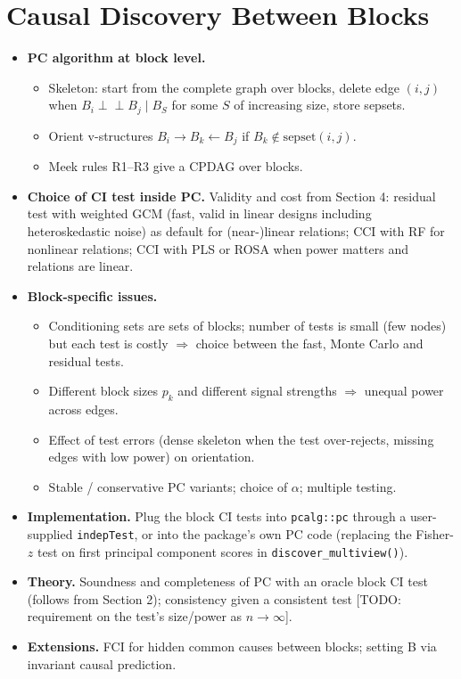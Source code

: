 \documentclass[10pt,leqno]{amsart}
\newcommand{\todo}[1]{{\color{red}[TODO: #1]}}
\newcommand{\ci}{\perp\!\!\!\perp}          %
\newcommand{\fn}[1]{\texttt{#1}}            %
\begin{document}
\section{Causal Discovery Between Blocks}
\begin{itemize}
\item \textbf{PC algorithm at block level.}
  \begin{itemize}
  \item Skeleton: start from the complete graph over blocks, delete edge $(i,j)$ when
    $B_i\ci B_j\mid B_S$ for some $S$ of increasing size, store sepsets.
  \item Orient v-structures $B_i\to B_k\leftarrow B_j$ if $B_k\notin\mathrm{sepset}(i,j)$.
  \item Meek rules R1--R3 give a CPDAG over blocks.
  \end{itemize}
\item \textbf{Choice of CI test inside PC.} Validity and cost from Section 4:
  residual test with weighted GCM (fast, valid in linear designs including
  heteroskedastic noise) as default for (near-)linear relations; CCI with RF for
  nonlinear relations; CCI with PLS or ROSA when power matters and relations are
  linear.
\item \textbf{Block-specific issues.}
  \begin{itemize}
  \item Conditioning sets are sets of blocks; number of tests is small (few
    nodes) but each test is costly $\Rightarrow$ choice between the fast, Monte Carlo
    and residual tests.
  \item Different block sizes $p_k$ and different signal strengths $\Rightarrow$
    unequal power across edges.
  \item Effect of test errors (dense skeleton when the test over-rejects, missing
    edges with low power) on orientation.
  \item Stable / conservative PC variants; choice of $\alpha$; multiple testing.
  \end{itemize}
\item \textbf{Implementation.} Plug the block CI tests into \texttt{pcalg::pc} through
  a user-supplied \texttt{indepTest}, or into the package's own PC code (replacing the
  Fisher-$z$ test on first principal component scores in \fn{discover\_multiview()}).
\item \textbf{Theory.} Soundness and completeness of PC with an oracle block CI test
  (follows from Section 2); consistency given a consistent test \todo{requirement
  on the test's size/power as $n\to\infty$}.
\item \textbf{Extensions.} FCI for hidden common causes between blocks; setting B
  via invariant causal prediction.
\end{itemize}
\end{document}
